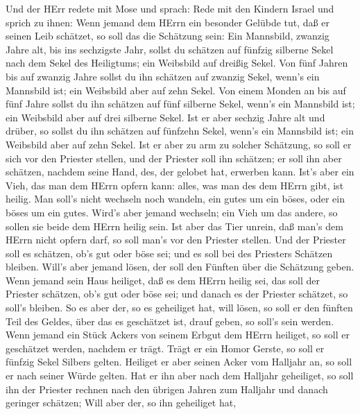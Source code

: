  Und der HErr redete mit Mose und sprach:  Rede
mit den Kindern Israel und sprich zu ihnen: Wenn jemand dem HErrn ein
besonder Gelübde tut, daß er seinen Leib schätzet,  so soll
das die Schätzung sein: Ein Mannsbild, zwanzig Jahre alt, bis ins
sechzigste Jahr, sollst du schätzen auf fünfzig silberne Sekel nach dem
Sekel des Heiligtums;  ein Weibsbild auf dreißig Sekel.
 Von fünf Jahren bis auf zwanzig Jahre sollst du ihn
schätzen auf zwanzig Sekel, wenn's ein Mannsbild ist; ein Weibsbild aber
auf zehn Sekel.  Von einem Monden an bis auf fünf Jahre
sollst du ihn schätzen auf fünf silberne Sekel, wenn's ein Mannsbild
ist; ein Weibsbild aber auf drei silberne Sekel.  Ist er
aber sechzig Jahre alt und drüber, so sollst du ihn schätzen auf
fünfzehn Sekel, wenn's ein Mannsbild ist; ein Weibsbild aber auf zehn
Sekel.  Ist er aber zu arm zu solcher Schätzung, so soll er
sich vor den Priester stellen, und der Priester soll ihn schätzen; er
soll ihn aber schätzen, nachdem seine Hand, des, der gelobet hat,
erwerben kann.  Ist's aber ein Vieh, das man dem HErrn
opfern kann: alles, was man des dem HErrn gibt, ist heilig.
 Man soll's nicht wechseln noch wandeln, ein gutes um ein
böses, oder ein böses um ein gutes. Wird's aber jemand wechseln; ein
Vieh um das andere, so sollen sie beide dem HErrn heilig sein.
 Ist aber das Tier unrein, daß man's dem HErrn nicht opfern
darf, so soll man's vor den Priester stellen.  Und der
Priester soll es schätzen, ob's gut oder böse sei; und es soll bei des
Priesters Schätzen bleiben.  Will's aber jemand lösen, der
soll den Fünften über die Schätzung geben.  Wenn jemand
sein Haus heiliget, daß es dem HErrn heilig sei, das soll der Priester
schätzen, ob's gut oder böse sei; und danach es der Priester schätzet,
so soll's bleiben.  So es aber der, so es geheiliget hat,
will lösen, so soll er den fünften Teil des Geldes, über das es
geschätzet ist, drauf geben, so soll's sein werden.  Wenn
jemand ein Stück Ackers von seinem Erbgut dem HErrn heiliget, so soll er
geschätzet werden, nachdem er trägt. Trägt er ein Homor Gerste, so soll
er fünfzig Sekel Silbers gelten.  Heiliget er aber seinen
Acker vom Halljahr an, so soll er nach seiner Würde gelten.
 Hat er ihn aber nach dem Halljahr geheiliget, so soll ihn
der Priester rechnen nach den übrigen Jahren zum Halljahr und danach
geringer schätzen;  Will aber der, so ihn geheiliget hat,
